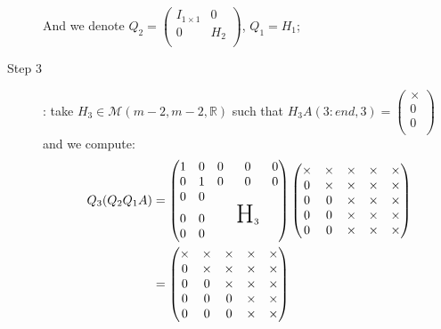 \documentclass[computational_mathematics.tex]{subfiles}
\begin{document}
\begin{example}
\begin{description}
    And we denote $Q_{2} =\begin{pmatrix}
        I_{1 \times 1} & 0\\
        0 & H_{2}\\
      \end{pmatrix}$, $Q_{1}=H_1$;
  \item[{\sc Step 3}]: take $H_{3} \in \mathcal{M}(m-2, m-2, \mathds{R})$ such that $H_{3}A(3:end, 3) = \begin{pmatrix} \times\\ 0\\ 0\\ \end{pmatrix}$
      and we compute:
      \begin{equation}
        \begin{aligned}
          Q_3 (Q_2 Q_1 A)
          &=  \begin{pmatrix}
          1 & 0 & 0 & 0 & 0\\
          0 & 1 & 0 & 0 & 0\\
          0 & 0 & & \\
          0 & 0 && \text{\huge H}_3\\
          0 & 0 &&\\
        \end{pmatrix} 
        \begin{pmatrix}
          \times & \times & \times & \times & \times\\
          0 & \times & \times & \times & \times\\
          0 & 0 & \times & \times & \times\\
          0 & 0 & \times & \times & \times\\
          0 & 0 & \times & \times & \times\\
        \end{pmatrix}\\
        &= \begin{pmatrix}
          \times & \times & \times & \times & \times\\
          0 & \times & \times & \times & \times\\
          0 & 0 & \times & \times & \times\\
          0 & 0 & 0 & \times & \times\\
          0 & 0 & 0 & \times & \times\\
        \end{pmatrix}
        \end{aligned}
      \end{equation}


\end{description}
\end{example}
\end{document}
